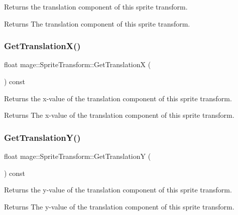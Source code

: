 Returns the translation component of this sprite transform.

\begin{DoxyReturn}{Returns}
The translation component of this sprite transform. 
\end{DoxyReturn}
\hypertarget{structmage_1_1_sprite_transform_a463d0a34f446f69b7ed505943e7e0532}{}\label{structmage_1_1_sprite_transform_a463d0a34f446f69b7ed505943e7e0532} 
\subsubsection{\texorpdfstring{Get\+Translation\+X()}{GetTranslationX()}}
{\footnotesize\ttfamily float mage\+::\+Sprite\+Transform\+::\+Get\+TranslationX (\begin{DoxyParamCaption}{ }\end{DoxyParamCaption}) const\hspace{0.3cm}{\ttfamily [noexcept]}}

Returns the x-\/value of the translation component of this sprite transform.

\begin{DoxyReturn}{Returns}
The x-\/value of the translation component of this sprite transform. 
\end{DoxyReturn}
\hypertarget{structmage_1_1_sprite_transform_ac38e744ac2a44e3aef7594c68232c6be}{}\label{structmage_1_1_sprite_transform_ac38e744ac2a44e3aef7594c68232c6be} 
\subsubsection{\texorpdfstring{Get\+Translation\+Y()}{GetTranslationY()}}
{\footnotesize\ttfamily float mage\+::\+Sprite\+Transform\+::\+Get\+TranslationY (\begin{DoxyParamCaption}{ }\end{DoxyParamCaption}) const\hspace{0.3cm}{\ttfamily [noexcept]}}

Returns the y-\/value of the translation component of this sprite transform.

\begin{DoxyReturn}{Returns}
The y-\/value of the translation component of this sprite transform. 
\end{DoxyReturn}
\hypertarget{structmage_1_1_sprite_transform_af0adccff92d48e7b347e66277981ee07}{}\label{structmage_1_1_sprite_transform_af0adccff92d48e7b347e66277981ee07} 
